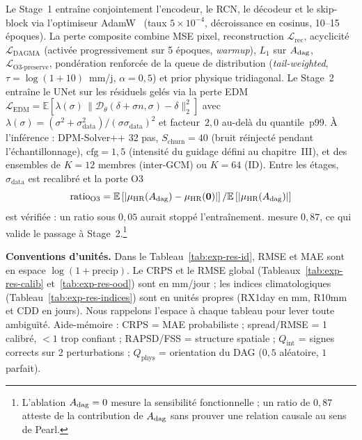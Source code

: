 Le Stage~1 entraîne conjointement l'encodeur, le RCN, le décodeur et le skip-block via l'optimiseur AdamW~\cite{loshchilov_adamw_2019} (taux $5 \times 10^{-4}$, décroissance en cosinus, 10--15 époques). La perte composite combine MSE pixel, reconstruction $\mathcal{L}_{\mathrm{rec}}$, acyclicité $\mathcal{L}_{\mathrm{DAGMA}}$ (activée progressivement sur 5 époques, \emph{warmup}), $L_1$ sur $A_{\mathrm{dag}}$, $\mathcal{L}_{\mathrm{O3\text{-}preserve}}$, pondération renforcée de la queue de distribution (\emph{tail-weighted}, $\tau = \log(1+10)$~mm/j, $\alpha=0{,}5$) et prior physique tridiagonal. Le Stage~2 entraîne le UNet sur les résiduels gelés via la perte EDM $\mathcal{L}_{\mathrm{EDM}} = \mathbb{E}[\lambda(\sigma)\,\|\mathcal{D}_\theta(\delta+\sigma n,\sigma)-\delta\|_2^2]$ avec $\lambda(\sigma)=(\sigma^2+\sigma_{\mathrm{data}}^2)/(\sigma\sigma_{\mathrm{data}})^2$ et facteur~$2{,}0$ au-delà du quantile~p99. À l'inférence : DPM-Solver++ 32 pas, $S_{\mathrm{churn}}=40$ (bruit réinjecté pendant l'échantillonnage), $\mathrm{cfg}=1{,}5$ (intensité du guidage défini au chapitre~III), et des ensembles de $K=12$ membres (inter-GCM) ou $K=64$ (ID). Entre les étages, $\sigma_{\mathrm{data}}$ est recalibré et la porte O3
\begin{equation}
  \mathrm{ratio}_{\mathrm{O3}} = \mathbb{E}\left[ \left\vert \mu_{\text{HR}}(A_{\mathrm{dag}}) - \mu_{\text{HR}}(\mathbf{0}) \right\vert \right] / \mathbb{E}\left[ \left\vert \mu_{\text{HR}}(A_{\mathrm{dag}}) \right\vert \right]
  \label{eq:exp-gate-o3}
\end{equation}
est vérifiée : un ratio sous $0{,}05$ aurait stoppé l'entraînement. \Oracle{} mesure $0{,}87$, ce qui valide le passage à Stage~2.\footnote{L'ablation $A_{\mathrm{dag}}=0$ mesure la sensibilité fonctionnelle ; un ratio de $0{,}87$ atteste de la contribution de $A_{\mathrm{dag}}$ sans prouver une relation causale au sens de Pearl.}

\label{sec:exp-protoc}

\textbf{Conventions d'unités.} Dans le Tableau~\ref{tab:exp-res-id}, RMSE et MAE sont en espace $\log(1+\mathrm{precip})$. Le CRPS et le RMSE global (Tableaux~\ref{tab:exp-res-calib} et~\ref{tab:exp-res-ood}) sont en mm/jour ; les indices climatologiques (Tableau~\ref{tab:exp-res-indices}) sont en unités propres (RX1day en mm, R10mm et CDD en jours). Nous rappelons l'espace à chaque tableau pour lever toute ambiguïté. Aide-mémoire : CRPS = MAE probabiliste ; spread/RMSE = 1 calibré, $<1$ trop confiant ; RAPSD/FSS = structure spatiale ; $Q_{\mathrm{int}}$ = signes corrects sur 2 perturbations ; $Q_{\mathrm{phys}}$ = orientation du DAG ($0{,}5$ aléatoire, $1$ parfait).

